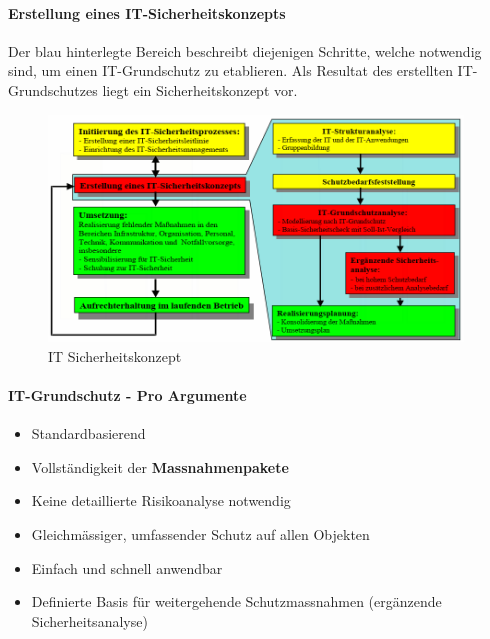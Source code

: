 \documentclass[10pt,a4paper]{article}
\begin{document}
\paragraph*{Erstellung eines IT-Sicherheitskonzepts} Der blau hinterlegte Bereich beschreibt diejenigen Schritte, welche notwendig sind, um einen IT-Grundschutz zu etablieren. Als Resultat des erstellten IT-Grundschutzes liegt ein Sicherheitskonzept vor.
\begin{figure}[H]
    \begin{center}
    \includegraphics[width=11cm]{images/IT_Sicherheitskonzept.png}
    \caption{IT Sicherheitskonzept}
    \label{IT Sicherheitskonzept}
    \end{center}
\end{figure}

\paragraph*{IT-Grundschutz - Pro Argumente}
\begin{itemize}[noitemsep,topsep=0pt,leftmargin=*]
    \item Standardbasierend
    \item Vollständigkeit der \textbf{Massnahmenpakete}
    \item Keine detaillierte Risikoanalyse notwendig
    \item Gleichmässiger, umfassender Schutz auf allen Objekten
    \item Einfach und schnell anwendbar
    \item Definierte Basis für weitergehende Schutzmassnahmen (ergänzende Sicherheitsanalyse)
\end{itemize}
\end{document}
